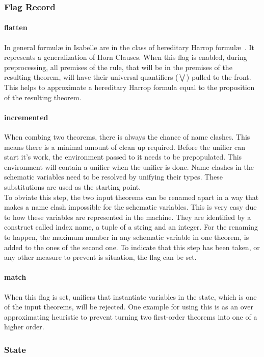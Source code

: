 \subsubsection{Flag Record}
\paragraph{flatten}
In general formul\ae {} in Isabelle are in the class of hereditary Harrop formul\ae~\parencite{implementation}. It represents a generalization of Horn Clauses. When this flag is enabled, during preprocessing, all premises of the rule, that will be in the premises of the resulting theorem, will have their universal quantifiers ($\bigvee$) pulled to the front. This helps to approximate a hereditary Harrop formula equal to the proposition of the resulting theorem.
\paragraph{incremented}
When combing two theorems, there is always the chance of name clashes. This means there is a minimal amount of clean up required. Before the unifier can start it's work, the environment passed to it needs to be prepopulated. This environment will contain a unifier when the unifier is done. Name clashes in the schematic variables need to be resolved by unifying their types. These substitutions are used as the starting point.\\
To obviate this step, the two input theorems can be renamed apart in a way that makes a name clash impossible for the schematic variables. This is very easy due to how these variables are represented in the machine. They are identified by a construct called index name, a tuple of a string and an integer. For the renaming to happen, the maximum number in any schematic variable in one theorem, is added to the ones of the second one. To indicate that this step has been taken, or any other measure to prevent is situation, the flag can be set.
\paragraph{match}
When this flag is set, unifiers that instantiate variables in the state, which is one of the input theorems, will be rejected. One example for using this is as an over approximating heuristic to prevent turning two first-order theorems into one of a higher order.

\subsubsection{State}
